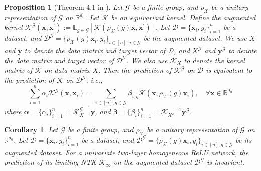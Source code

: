 \documentclass{article}
\newcommand{\G}{\mathcal{G}}
\newcommand{\X}{\mathcal{X}}
\theoremstyle{plain}
\newtheorem{proposition}[theorem]{Proposition}
\newtheorem{corollary}[theorem]{Corollary}
\theoremstyle{definition}
\theoremstyle{remark}
\theoremstyle{remark}
\begin{document}
\begin{proposition} [Theorem 4.1 in \citet{li_2019_cntk}] \label{prop: data_augmentation_ntk}
  Let $\G$ be a finite group, and $\rho_{\X}$ be a unitary representation of $\G$ on $\mathbb{R}^{d_0}$. Let $\mathcal{K}$ be an equivariant kernel.
  Define the augmented kernel $\mathcal{K}^{\G}(\mathbf{x}, \mathbf{x}^\prime) := \mathbb{E}_{g \in \G}[\mathcal{K}(\rho_{\X}(g) \mathbf{x}, \mathbf{x}^\prime)]$. Let $\mathcal{D} = \{\mathbf{x}_i, y_i\}_{i=1}^{n}$ be a dataset, and $\mathcal{D}^{\G} = \{\rho_{\X}(g) \mathbf{x}_i, y_i\}_{i \in [n], g \in \G}$ be the augmented dataset. 
  We use $X$ and $\mathbf{y}$ to denote the data matrix and target vector of $\mathcal{D}$, and $X^{\G}$ and $\mathbf{y}^{\G}$ to denote the data matrix and target vector of $\mathcal{D}^{\G}$.
  We also use $\mathcal{K}_{X}$ to denote the kernel matrix of $\mathcal{K}$ on data matrix $X$.
  Then the prediction of $\mathcal{K}^{\G}$ on $\mathcal{D}$ is equivalent to the prediction of $\mathcal{K}$ on $\mathcal{D}^{\G}$, i.e., 
  \[
  \sum_{i=1}^{n} \alpha_i \mathcal{K}^{\G} (\mathbf{x}, \mathbf{x}_i) = \sum_{i \in [n], g \in \G} \beta_{i,g} \mathcal{K}(\mathbf{x}, \rho_{\X}(g) \mathbf{x}_i), \quad \forall \mathbf{x} \in \mathbb{R}^{d_0}
  \]
  where $\boldsymbol{\alpha} = \{\alpha_i\}_{i=1}^{n} = {\mathcal{K}_{X}^{\G}}^{-1} \mathbf{y}$, and $\boldsymbol{\beta} = \{\beta_i\}_{i=1}^{n} = {\mathcal{K}_{X^{\G}}}^{-1} \mathbf{y}^{\G}$.
\end{proposition}

\begin{corollary}
  Let $\G$ be a finite group, and $\rho_{\X}$ be a unitary representation of $\G$ on $\mathbb{R}^{d_0}$. 
  Let $\mathcal{D} = \{\mathbf{x}_i, y_i\}_{i=1}^{n}$ be a dataset, and $\mathcal{D}^{\G} = \{\rho_{\X}(g) \mathbf{x}_i, y_i\}_{i \in [n], g \in \G}$ be its augmented dataset. 
  For a univariate two-layer homogeneous ReLU network, the prediction of its limiting NTK $\mathcal{K}_{\infty}$ on the augmented dataset $\mathcal{D}^{\G}$ is invariant.
\end{corollary}
\end{document}
